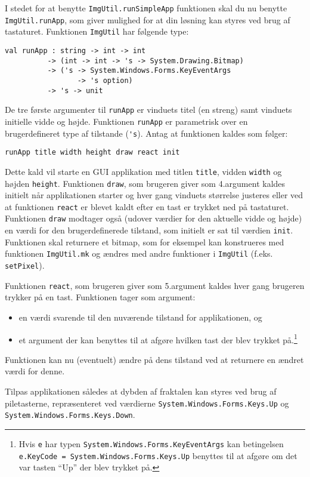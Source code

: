 \label{sierpinskikeys.ov} I stedet for at benytte
  \lstinline{ImgUtil.runSimpleApp} funktionen skal du nu benytte
  \lstinline{ImgUtil.runApp}, som giver mulighed for at din løsning
  kan styres ved brug af tastaturet. Funktionen \lstinline{ImgUtil}
  har følgende type:
\begin{footnotesize}
\begin{lstlisting}[numbers=none,frame=none,mathescape]
val runApp : string -> int -> int
          -> (int -> int -> 's -> System.Drawing.Bitmap)
          -> ('s -> System.Windows.Forms.KeyEventArgs
                 -> 's option)
          -> 's -> unit
\end{lstlisting}
\end{footnotesize}
De tre første argumenter til \lstinline{runApp} er vinduets titel (en
streng) samt vinduets initielle vidde og højde. Funktionen
\lstinline{runApp} er parametrisk over en brugerdefineret type af tilstande (\lstinline{'s}). Antag at funktionen kaldes som følger:
\begin{footnotesize}
\begin{lstlisting}[numbers=none,frame=none,mathescape]
  runApp title width height draw react init
\end{lstlisting}
\end{footnotesize}
Dette kald vil starte en GUI applikation med titlen \lstinline{title},
vidden \lstinline{width} og højden \lstinline{height}. Funktionen
\lstinline{draw}, som brugeren giver som 4.\@ argument kaldes initielt
når applikationen starter og hver gang vinduets størrelse justeres
eller ved at funktionen \lstinline{react} er blevet kaldt efter en
tast er trykket ned på tastaturet. Funktionen \lstinline{draw} modtager
også (udover værdier for den aktuelle vidde og højde) en værdi for den
brugerdefinerede tilstand, som initielt er sat til værdien
\lstinline{init}. Funktionen skal returnere et bitmap, som for
eksempel kan konstrueres med funktionen \lstinline{ImgUtil.mk} og
ændres med andre funktioner i \lstinline{ImgUtil}
(f.eks. \lstinline{setPixel}).

Funktionen \lstinline{react}, som brugeren giver som 5.\@ argument
kaldes hver gang brugeren trykker på en tast. Funktionen tager som
argument:
\begin{itemize}
\item en værdi svarende til den nuværende tilstand for
applikationen, og
\item et argument der kan benyttes til at afgøre hvilken
tast der blev trykket på.\footnote{Hvis \lstinline{e} har typen
  \lstinline{System.Windows.Forms.KeyEventArgs} kan betingelsen
  \lstinline{e.KeyCode = System.Windows.Forms.Keys.Up} benyttes til at
  afgøre om det var tasten ``Up'' der blev trykket på.} 
\end{itemize}
Funktionen kan
nu (eventuelt) ændre på dens tilstand ved at returnere en ændret værdi
for denne.

Tilpas applikationen således at dybden af
fraktalen kan styres ved brug af piletasterne, repræsenteret ved værdierne
\lstinline{System.Windows.Forms.Keys.Up} og
\lstinline{System.Windows.Forms.Keys.Down}.

